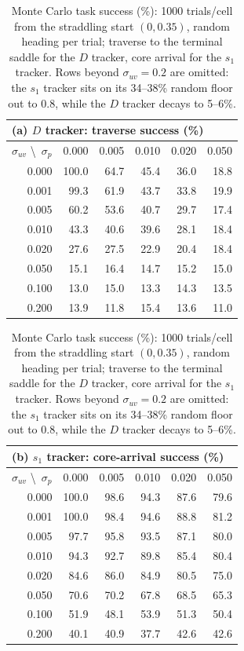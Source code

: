 \documentclass[lettersize,journal]{IEEEtran}
\begin{document}
\begin{table}[!t]
\centering
\caption{Monte Carlo task success (\%): 1000 trials/cell from the
straddling start $(0, 0.35)$, random heading per trial; traverse to
the terminal saddle for the $D$ tracker, core arrival for the $s_1$
tracker. Rows beyond $\sigma_{uv} = 0.2$ are omitted: the $s_1$
tracker sits on its 34--38\% random floor out to 0.8, while the $D$
tracker decays to 5--6\%.}
\label{tab:mc_success}
\footnotesize
\setlength{\tabcolsep}{4pt}
\begin{tabular}{r|rrrrr}
\multicolumn{6}{l}{(a) $D$ tracker: traverse success (\%)} \\
\hline
$\sigma_{uv}$ \textbackslash\ $\sigma_p$ & 0.000 & 0.005 & 0.010 & 0.020 & 0.050 \\
\hline
0.000 & 100.0 & 64.7 & 45.4 & 36.0 & 18.8 \\
0.001 &  99.3 & 61.9 & 43.7 & 33.8 & 19.9 \\
0.005 &  60.2 & 53.6 & 40.7 & 29.7 & 17.4 \\
0.010 &  43.3 & 40.6 & 39.6 & 28.1 & 18.4 \\
0.020 &  27.6 & 27.5 & 22.9 & 20.4 & 18.4 \\
0.050 &  15.1 & 16.4 & 14.7 & 15.2 & 15.0 \\
0.100 &  13.0 & 15.0 & 13.3 & 14.3 & 13.5 \\
0.200 &  13.9 & 11.8 & 15.4 & 13.6 & 11.0 \\
\hline
\end{tabular}
\hspace{1.5em}
\begin{tabular}{r|rrrrr}
\multicolumn{6}{l}{(b) $s_1$ tracker: core-arrival success (\%)} \\
\hline
$\sigma_{uv}$ \textbackslash\ $\sigma_p$ & 0.000 & 0.005 & 0.010 & 0.020 & 0.050 \\
\hline
0.000 & 100.0 & 98.6 & 94.3 & 87.6 & 79.6 \\
0.001 & 100.0 & 98.4 & 94.6 & 88.8 & 81.2 \\
0.005 &  97.7 & 95.8 & 93.5 & 87.1 & 80.0 \\
0.010 &  94.3 & 92.7 & 89.8 & 85.4 & 80.4 \\
0.020 &  84.6 & 86.0 & 84.9 & 80.5 & 75.0 \\
0.050 &  70.6 & 70.2 & 67.8 & 68.5 & 65.3 \\
0.100 &  51.9 & 48.1 & 53.9 & 51.3 & 50.4 \\
0.200 &  40.1 & 40.9 & 37.7 & 42.6 & 42.6 \\
\hline
\end{tabular}
\end{table}
\end{document}
